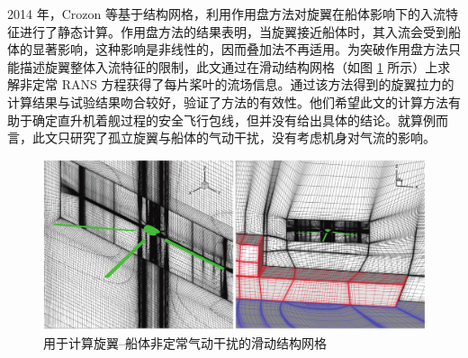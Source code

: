 2014 年，Crozon 等基于结构网格，利用作用盘方法对旋翼在船体影响下的入流特征进行了静态计算。作用盘方法的结果表明，当旋翼接近船体时，其入流会受到船体的显著影响，这种影响是非线性的，因而叠加法不再适用。为突破作用盘方法只能描述旋翼整体入流特征的限制，此文通过在滑动结构网格（如图
\ref{fig:sliding-mesh} 所示）上求解非定常 RANS 方程获得了每片桨叶的流场信息。通过该方法得到的旋翼拉力的计算结果与试验结果吻合较好，验证了方法的有效性。他们希望此文的计算方法有助于确定直升机着舰过程的安全飞行包线，但并没有给出具体的结论。就算例而言，此文只研究了孤立旋翼与船体的气动干扰，没有考虑机身对气流的影响。
\begin{figure}[h!]
\begin{centering}
\includegraphics[width=1\textwidth,height=0.3\textheight,keepaspectratio]{../review/figures/structured_sliding_mesh}
\par\end{centering}
\caption{\label{fig:sliding-mesh}用于计算旋翼–船体非定常气动干扰的滑动结构网格}
\end{figure}

